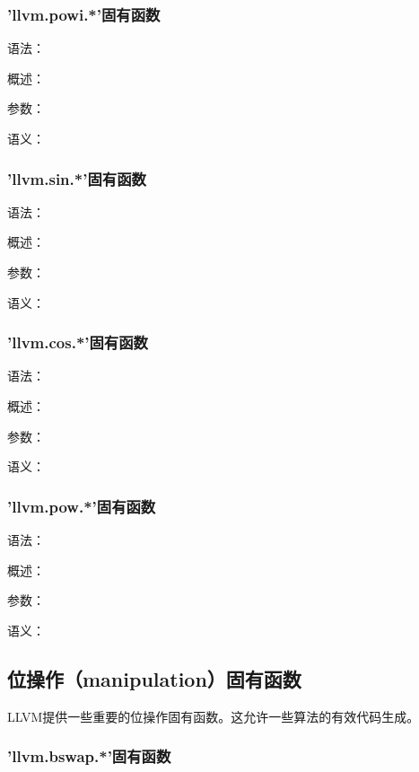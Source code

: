 \documentclass[12pt,a4paper]{article}
\begin{document}
{\subsubsection{'llvm.powi.*'固有函数} %

语法：

概述：

参数：

语义：


\subsubsection{'llvm.sin.*'固有函数} %

语法：

概述：

参数：

语义：


\subsubsection{'llvm.cos.*'固有函数} %

语法：

概述：

参数：

语义：


\subsubsection{'llvm.pow.*'固有函数} %

语法：

概述：

参数：

语义：


\subsection{位操作（manipulation）固有函数}

LLVM提供一些重要的位操作固有函数。这允许一些算法的有效代码生成。

\subsubsection{'llvm.bswap.*'固有函数} %

}
\end{document}

